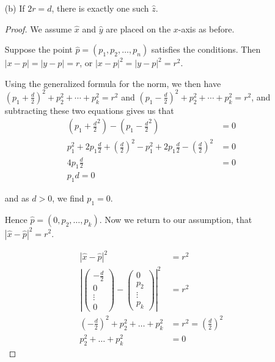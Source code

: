 \documentclass{article}
\newcommand{\abs}[1]{\left| #1 \right|}
\newcommand{\paren}[1]{\left( #1 \right)}
\begin{document}
\begin{enumerate}
\begin{proof}
    The calculation is similar for $\abs{\hat z - \hat y}$; the only difference is the sign of $\frac{d}{2}$, and it's squared after so it doesn't matter.
    \end{proof}



    \item[(b)] If $2r = d$, there is exactly one such $\hat z$.

    \begin{proof}

    We assume $\hat x$ and $\hat y$ are placed on the $x$-axis as before.

    Suppose the point $\hat p = (p_1, p_2, \dots, p_n)$ satisfies the conditions. Then $\abs{x - p} = \abs{y - p} = r$, or $\abs{x - p}^2 = \abs{y - p}^2 = r^2$.

    Using the generalized formula for the norm, we then have $(p_1 + \frac{d}{2})^2 + p_2^2 + \cdots + p_k^2 = r^2$ and $(p_1 - \frac{d}{2})^2 + p_2^2 + \cdots + p_k^2 = r^2$, and subtracting these two equations gives us that 
    \begin{align*}
        \paren{p_1 + \frac{d}{2}^2} - \paren{p_1 - \frac{d}{2}^2} &= 0 \\
        p_1^2 + 2p_1 \frac{d}{2} + \paren{\frac{d}{2}}^2 - p_1^2 + 2 p_1 \frac{d}{2} - \paren{\frac{d}{2}}^2 &= 0 \\
        4p_1 \frac{d}{2} &= 0 \\
        p_1 d = 0
    \end{align*}

    and as $d > 0$, we find $p_1 = 0$. 

    Hence $\hat p = \paren{0, p_2, \dots, p_k}$. Now we return to our assumption, that $\abs{\hat x - \hat p}^2 = r^2$.

    \begin{align*}
        \abs{\hat x - \hat p}^2 &= r^2 \\
        \abs{\begin{pmatrix}
            -\frac{d}{2} \\
            0 \\
            \vdots \\
            0
        \end{pmatrix} - 
        \begin{pmatrix}
            0 \\
            p_2 \\
            \vdots \\
            p_k
        \end{pmatrix}}^2 &= r^2 \\
        \paren{-\frac{d}{2}}^2 + p_2^2 + \dots + p_k^2 &= r^2 = \paren{\frac{d}{2}}^2 \\
        p_2^2 + \dots + p_k^2 &= 0
    \end{align*}


\end{proof}
\end{enumerate}
\end{document}
